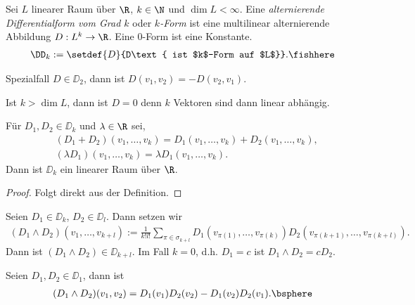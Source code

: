 \begin{defn}
\label{defn:4.66}
Sei $L$ linearer Raum über $\R$, $k\in\N$ und $\dim L < \infty$. Eine
\emph{alternierende Differentialform vom Grad $k$} oder \emph{$k$-Form}
ist eine multilinear alternierende Abbildung $D: L^k\to\R$. Eine $0$-Form ist
eine Konstante.
\begin{align*}
\DD_k := \setdef{D}{D\text{ ist $k$-Form auf $L$}}.\fishhere
\end{align*}
\end{defn}
\begin{bemn}[Bemerkungen.]
Spezialfall $D\in\DD_2$, dann ist $D(v_1,v_2) = -D(v_2,v_1)$.

Ist $k>\dim L$, dann ist $D=0$ denn $k$ Vektoren sind dann linear
abhängig.\maphere
\end{bemn}

\begin{prop}
\label{prop:4.67}
Für $D_1,D_2\in\DD_k$ und $\lambda\in\R$ sei,
\begin{align*}
&(D_1+D_2)(v_1,\ldots,v_k) = D_1(v_1,\ldots,v_k) + D_2(v_1,\ldots,v_k),\\
&(\lambda D_1)(v_1,\ldots,v_k) = \lambda D_1(v_1,\ldots,v_k).
\end{align*}
Dann ist $\DD_k$ ein linearer Raum über $\R$.
\end{prop}
\begin{proof}
Folgt direkt aus der Definition.\qedhere
\end{proof}

\begin{defn}
\label{defn:4.68}
Seien $D_1\in\DD_k$, $D_2\in\DD_l$. Dann setzen wir
\begin{align*}
(D_1\land D_2)(v_1,\ldots,v_{k+l}) :=
\frac{1}{k!l!}\sum\limits_{\pi\in\sigma_{k+l}}
D_1(v_{\pi(1)},\ldots,v_{\pi(k)})D_2(v_{\pi(k+1)},\ldots,v_{\pi(k+l)}).
\end{align*}
Dann ist $(D_1\land D_2)\in\DD_{k+l}$. Im Fall $k=0$, d.h. $D_1=c$ ist
$D_1\land D_2 = c D_2$.
\end{defn}

\begin{bsp}
\label{bsp:4.69}
Seien $D_1,D_2\in\DD_1$, dann ist
\begin{align*}
(D_1\land D_2)(v_1,v_2) = D_1(v_1)D_2(v_2) - D_1(v_2)D_2(v_1).\bsphere
\end{align*}
\end{bsp}

